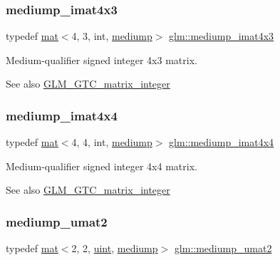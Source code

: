 \subsubsection{\texorpdfstring{mediump\+\_\+imat4x3}{mediump\_imat4x3}}
{\footnotesize\ttfamily typedef \hyperlink{structglm_1_1mat}{mat}$<$4, 3, int, \hyperlink{namespaceglm_a36ed105b07c7746804d7fdc7cc90ff25a6416f3ea0c9025fb21ed50c4d6620482}{mediump}$>$ \hyperlink{group__gtc__matrix__integer_ga213644b63e6ee8ac783fd9a75e3c5abb}{glm\+::mediump\+\_\+imat4x3}}

Medium-\/qualifier signed integer 4x3 matrix. \begin{DoxySeeAlso}{See also}
\hyperlink{group__gtc__matrix__integer}{G\+L\+M\+\_\+\+G\+T\+C\+\_\+matrix\+\_\+integer} 
\end{DoxySeeAlso}
\mbox{\label{group__gtc__matrix__integer_gaf45ac606a3fb21f46228524d1d322eb2}} 
\subsubsection{\texorpdfstring{mediump\+\_\+imat4x4}{mediump\_imat4x4}}
{\footnotesize\ttfamily typedef \hyperlink{structglm_1_1mat}{mat}$<$4, 4, int, \hyperlink{namespaceglm_a36ed105b07c7746804d7fdc7cc90ff25a6416f3ea0c9025fb21ed50c4d6620482}{mediump}$>$ \hyperlink{group__gtc__matrix__integer_gaf45ac606a3fb21f46228524d1d322eb2}{glm\+::mediump\+\_\+imat4x4}}

Medium-\/qualifier signed integer 4x4 matrix. \begin{DoxySeeAlso}{See also}
\hyperlink{group__gtc__matrix__integer}{G\+L\+M\+\_\+\+G\+T\+C\+\_\+matrix\+\_\+integer} 
\end{DoxySeeAlso}
\mbox{\label{group__gtc__matrix__integer_gaafd6d236ce051d138e3fdf53de3813e6}} 
\subsubsection{\texorpdfstring{mediump\+\_\+umat2}{mediump\_umat2}}
{\footnotesize\ttfamily typedef \hyperlink{structglm_1_1mat}{mat}$<$2, 2, \hyperlink{group__core__precision_ga4fd29415871152bfb5abd588334147c8}{uint}, \hyperlink{namespaceglm_a36ed105b07c7746804d7fdc7cc90ff25a6416f3ea0c9025fb21ed50c4d6620482}{mediump}$>$ \hyperlink{group__gtc__matrix__integer_gaafd6d236ce051d138e3fdf53de3813e6}{glm\+::mediump\+\_\+umat2}}

